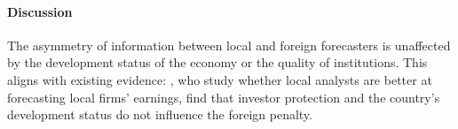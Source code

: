 
{
	
}

\paragraph{Discussion}


The asymmetry of information between local and foreign forecasters is unaffected by the development status of the economy or the quality of institutions. This aligns with existing evidence: \citet{Baeetal2008}, who study whether local analysts are better at forecasting local firms' earnings, find that investor protection and the country's development status do not influence the foreign penalty.



